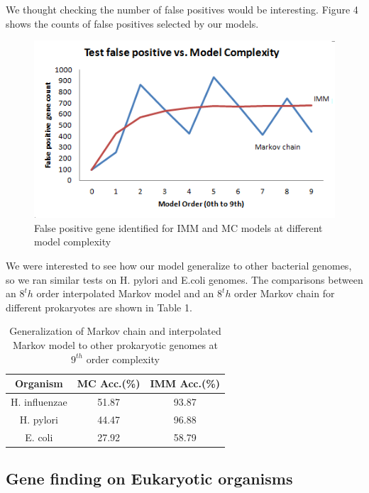 \documentclass[11pt,letterpaper]{article}
\begin{document}
We thought checking the number of false positives would be interesting. Figure 4 shows the counts of false positives selected by our models. 

\begin{figure}
	\begin{center}
		\includegraphics[scale=0.8]{plots/false_positives_vs_model_complexity.png}
	\end{center}
	\caption{\label{font-table} False positive gene identified for IMM and MC models at different model complexity}
\end{figure}

We were interested to see how our model generalize to other bacterial genomes, so we ran similar tests on H. pylori and E.coli genomes. The comparisons between an $8^th$ order interpolated Markov model and an $8^th$ order Markov chain for different prokaryotes are shown in Table 1.

\begin{table}
	\begin{center}
		\begin{tabular}{|c|c|c|}
			\hline \bf Organism & \bf MC Acc.(\%) & \bf IMM Acc.(\%) \\ \hline
			H. influenzae & 51.87 & 93.87 \\
			\hline
			H. pylori & 44.47 & 96.88 \\
			\hline
			E. coli & 27.92 & 58.79 \\
			\hline
		\end{tabular}
	\end{center}
	\caption{\label{font-table} Generalization of Markov chain and interpolated Markov model to other prokaryotic genomes at $9^{th}$ order complexity}
\end{table}


\subsection{Gene finding on Eukaryotic organisms}
\end{document}
